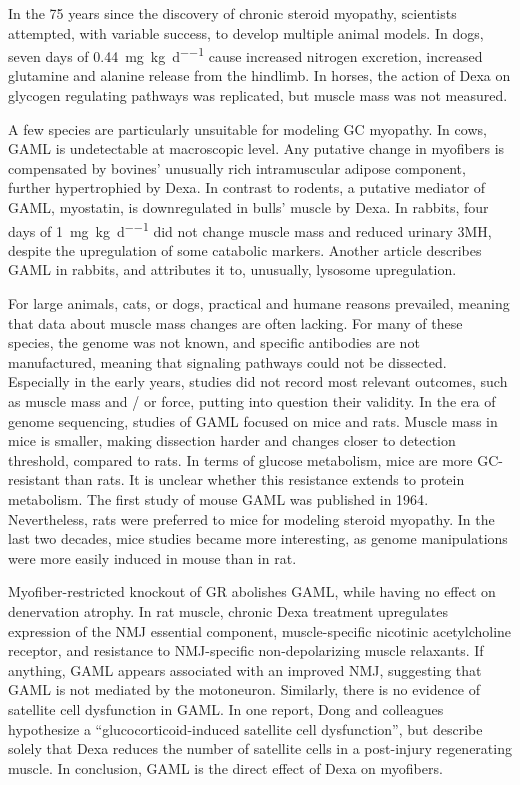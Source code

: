 \documentclass[12pt,english]{report}\usepackage[]{graphicx}\usepackage[]{color}
\begin{document}
In the 75 years since the discovery of chronic steroid myopathy, scientists
attempted, with variable success, to develop multiple animal models.
In dogs, seven days of \SI{0.44}{\milli\gram\per\kilo\gram\per\day}
cause increased nitrogen excretion, increased glutamine and alanine
release from the hindlimb\citep{muhlbacher1984effects}. In horses,
the action of Dexa on glycogen regulating pathways was replicated,
but muscle mass was not measured\citep{tiley2008effects}. 

A few species are particularly unsuitable for modeling GC myopathy.
In cows, GAML is undetectable at macroscopic level. Any putative change
in myofibers is compensated by bovines' unusually rich intramuscular
adipose component, further hypertrophied by Dexa\citep{corah1995effects}.
In contrast to rodents, a putative mediator of GAML, myostatin, is
downregulated in bulls' muscle by Dexa\citep{carraro2009expression}.
In rabbits, four days of \SI{1}{\milli\gram\per\kilo\gram\per\day}
did not change muscle mass and reduced urinary 3MH, despite the upregulation
of some catabolic markers\citep{yeh1994effects}. Another article
describes GAML in rabbits, and attributes it to, unusually, lysosome
upregulation\citep{clark1981role}.

For large animals, cats, or dogs, practical and humane reasons prevailed,
meaning that data about muscle mass changes are often lacking. For
many of these species, the genome was not known, and specific antibodies
are not manufactured, meaning that signaling pathways could not be
dissected. Especially in the early years, studies did not record most
relevant outcomes, such as muscle mass and / or force, putting into
question their validity. In the era of genome sequencing, studies
of GAML focused on mice and rats. Muscle mass in mice is smaller,
making dissection harder and changes closer to detection threshold,
compared to rats. In terms of glucose metabolism, mice are more GC-resistant
than rats\citep{protzek2014augmented}. It is unclear whether this
resistance extends to protein metabolism. The first study of mouse
GAML was published in 1964\citep{rohdewald1964uber}. Nevertheless,
rats were preferred to mice for modeling steroid myopathy. In the
last two decades, mice studies became more interesting, as genome
manipulations were more easily induced in mouse than in rat.

Myofiber-restricted knockout of GR abolishes GAML, while having no
effect on denervation atrophy\citep{watson2012cell-autonomous}. In
rat muscle, chronic Dexa treatment upregulates expression of the NMJ
essential component, muscle-specific nicotinic acetylcholine receptor,
and resistance to NMJ-specific non-depolarizing muscle relaxants\citep{chen2014different}.
If anything, GAML appears associated with an improved NMJ, suggesting
that GAML is not mediated by the motoneuron. Similarly, there is no
evidence of satellite cell dysfunction in GAML. In one report, Dong
and colleagues hypothesize a ``glucocorticoid-induced satellite cell
dysfunction'', but describe solely that Dexa reduces the number of
satellite cells in a post-injury regenerating muscle\citep{dong2013myostatin}.
In conclusion, GAML is the direct effect of Dexa on myofibers. 
\end{document}
